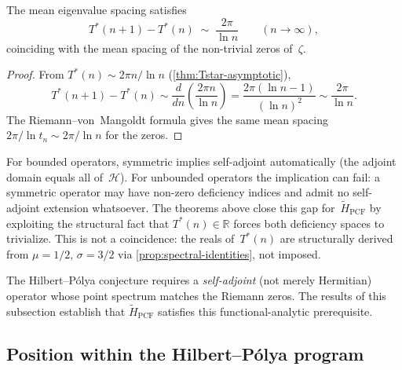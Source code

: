 \begin{Proposition}\label{prop:spectral-gap}
The mean eigenvalue spacing satisfies
\begin{equation}\label{eq:spectral-gap}
  T^*(n+1) - T^*(n) \;\sim\; \frac{2\pi}{\ln n}
  \qquad (n\to\infty),
\end{equation}
coinciding with the mean spacing of the non-trivial zeros of~$\zeta$.
\end{Proposition}

\begin{proof}
From $T^*(n)\sim 2\pi n/\ln n$
(\cref{thm:Tstar-asymptotic}),
\[
  T^*(n{+}1) - T^*(n)
  \sim \frac{d}{dn}\!\left(\frac{2\pi n}{\ln n}\right)
  = \frac{2\pi(\ln n - 1)}{(\ln n)^2}
  \sim \frac{2\pi}{\ln n}.
\]
The Riemann--von~Mangoldt formula gives the same mean
spacing $2\pi/\ln t_n\sim 2\pi/\ln n$ for the zeros.
\end{proof}

\begin{Remark}
For bounded operators, symmetric implies self-adjoint automatically (the
adjoint domain equals all of~$\mathcal{H}$).  For unbounded operators the
implication can fail: a symmetric operator may have non-zero deficiency
indices and admit no self-adjoint extension whatsoever.  The theorems
above close this gap for~$\tilde{H}_{\mathrm{PCF}}$ by exploiting the
structural fact that $T^*(n)\in\mathbb{R}$ forces both deficiency spaces
to trivialize.  This is not a coincidence: the reals of~$T^*(n)$ are
structurally derived from $\mu = 1/2$, $\sigma = 3/2$ via
\cref{prop:spectral-identities}, not imposed.
\end{Remark}

\begin{Remark}
The Hilbert--P\'olya conjecture requires a \emph{self-adjoint} (not
merely Hermitian) operator whose point spectrum matches the Riemann
zeros.  The results of this subsection establish that
$\tilde{H}_{\mathrm{PCF}}$ satisfies this functional-analytic
prerequisite.
\end{Remark}


\subsection{Position within the Hilbert--P\'olya
program}\label{ssec:hp-position}

